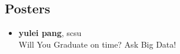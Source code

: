 \subsection*{Posters}
\begin{itemize}
\item \textbf{yulei pang}, scsu \\
Will You Graduate on time? Ask Big Data! \\


\end{itemize}

